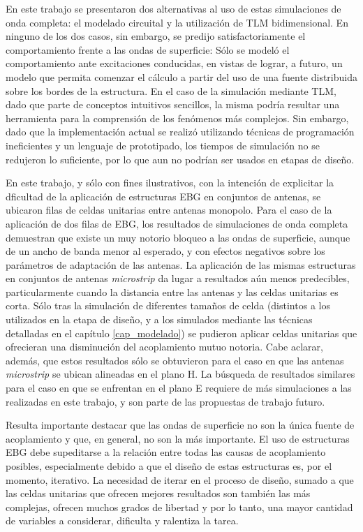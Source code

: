 En este trabajo se presentaron dos alternativas al uso de estas simulaciones de onda completa: el modelado circuital y la utilización de TLM bidimensional. En ninguno de los dos casos, sin embargo, se predijo satisfactoriamente el comportamiento frente a las ondas de superficie: Sólo se modeló el comportamiento ante excitaciones conducidas, en vistas de lograr, a futuro, un modelo que permita comenzar el cálculo a partir del uso de una fuente distribuida sobre los bordes de la estructura. En el caso de la simulación mediante TLM, dado que parte de conceptos intuitivos sencillos, la misma podría resultar una herramienta para la comprensión de los fenómenos más complejos. Sin embargo, dado que la implementación actual se realizó utilizando técnicas de programación ineficientes y un lenguaje de prototipado, los tiempos de simulación no se redujeron lo suficiente, por lo que aun no podrían ser usados en etapas de diseño.

En este trabajo, y sólo con fines ilustrativos, con la intención de explicitar la dficultad de la aplicación de estructuras EBG en conjuntos de antenas, se ubicaron filas de celdas unitarias entre antenas monopolo. Para el caso de la aplicación de dos filas de EBG, los resultados de simulaciones de onda completa demuestran que existe un muy notorio bloqueo a las ondas de superficie, aunque de un ancho de banda menor al esperado, y con efectos negativos sobre los parámetros de adaptación de las antenas. La aplicación de las mismas estructuras en conjuntos de antenas \textit{microstrip} da lugar a resultados aún menos predecibles, particularmente cuando la distancia entre las antenas y las celdas unitarias es corta. Sólo tras la simulación de diferentes tamaños de celda (distintos a los utilizados en la etapa de diseño, y a los simulados  mediante las técnicas detalladas en el capítulo \ref{cap_modelado}) se pudieron aplicar celdas unitarias que ofrecieran una disminución del acoplamiento mutuo notoria. Cabe aclarar, además, que estos resultados sólo se obtuvieron para el caso en que las antenas \textit{microstrip} se ubican alineadas en el plano H. La búsqueda de resultados similares para el caso en que se enfrentan en el plano E requiere de más simulaciones a las realizadas en este trabajo, y son parte de las propuestas de trabajo futuro.

Resulta importante destacar que las ondas de superficie no son la única fuente de acoplamiento y que, en general, no son la más importante. El uso de estructuras EBG debe supeditarse a la relación entre todas las causas de acoplamiento posibles, especialmente debido a que el diseño de estas estructuras es, por el momento, iterativo. La necesidad de iterar en el proceso de diseño, sumado a que las celdas unitarias que ofrecen mejores resultados son también las más complejas, ofrecen muchos grados de libertad y por lo tanto, una mayor cantidad de variables a considerar, dificulta y ralentiza la tarea.

